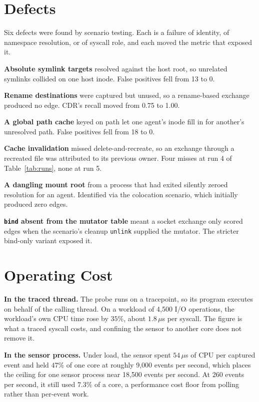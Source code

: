 \documentclass[11pt]{article}
\begin{document}
\section{Defects}

Six defects were found by scenario testing. Each is a failure of identity, of namespace
resolution, or of syscall role, and each moved the metric that exposed it.

\noindent\textbf{Absolute symlink targets} resolved against the host root, so unrelated
symlinks collided on one host inode. False positives fell from 13 to 0.

\noindent\textbf{Rename destinations} were captured but unused, so a rename-based
exchange produced no edge. CDR's recall moved from 0.75 to 1.00.

\noindent\textbf{A global path cache} keyed on path let one agent's inode fill in for
another's unresolved path. False positives fell from 18 to 0.

\noindent\textbf{Cache invalidation} missed delete-and-recreate, so an exchange through
a recreated file was attributed to its previous owner. Four misses at run 4 of
Table~\ref{tab:runs}, none at run 5.

\noindent\textbf{A dangling mount root} from a process that had exited silently zeroed
resolution for an agent. Identified via the colocation scenario, which initially
produced zero edges.

\noindent\textbf{\texttt{bind} absent from the mutator table} meant a socket exchange
only scored edges when the scenario's cleanup \texttt{unlink} supplied the mutator. The
stricter bind-only variant exposed it.

\section{Operating Cost}

\textbf{In the traced thread.} The probe runs on a tracepoint, so its program executes
on behalf of the calling thread. On a workload of 4,500 I/O operations, the
workload's own CPU time rose by $35\%$, about $1.8\,\mu$s per syscall. The figure is
what a traced syscall costs, and confining the sensor to another core does not remove it.

\textbf{In the sensor process.} Under load, the sensor spent $54\,\mu$s of CPU per
captured event and held $47\%$ of one core at roughly 9,000 events per second, which
places the ceiling for one sensor process near 18,500 events per second. At 260 events
per second, it still used $7.3\%$ of a core, a performance cost floor from polling
rather than per-event work.
\end{document}
